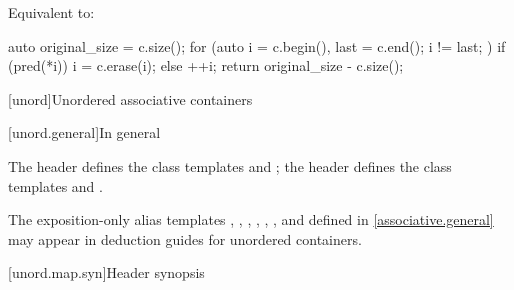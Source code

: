 \begin{itemdescr}
\pnum
\effects
Equivalent to:
\begin{codeblock}
auto original_size = c.size();
for (auto i = c.begin(), last = c.end(); i != last; ) {
  if (pred(*i)) {
    i = c.erase(i);
  } else {
    ++i;
  }
}
return original_size - c.size();
\end{codeblock}
\end{itemdescr}

[unord]{Unordered associative containers}

[unord.general]{In general}

\pnum
The header  defines the class templates
 and
; the header  defines the class templates
 and .

\pnum
The exposition-only alias templates
, ,
, ,
, ,
and 
defined in \ref{associative.general} may appear in deduction guides for unordered containers.

[unord.map.syn]{Header  synopsis}

